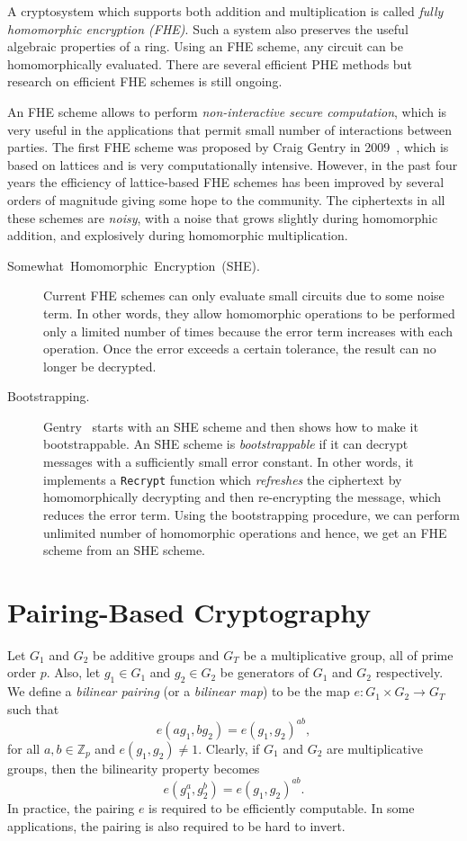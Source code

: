 \documentclass[10pt]{article}
\theoremstyle{plain}
\begin{document}
A cryptosystem which supports both addition and multiplication is
called \textit{fully homomorphic encryption (FHE)}. Such a system
also preserves the useful algebraic properties of a ring. Using an
FHE scheme, any circuit can be homomorphically evaluated. There are
several efficient PHE methods but research on efficient FHE schemes
is still ongoing.

An FHE scheme allows to perform \emph{non-interactive secure computation},
which is very useful in the applications that permit small number
of interactions between parties. The first FHE scheme was proposed
by Craig Gentry in 2009~\cite{Gentry:2009:FHE:1536414.1536440},
which is based on lattices and is very computationally intensive.
However, in the past four years the efficiency of lattice-based FHE
schemes has been improved by several orders of magnitude giving some
hope to the community. The ciphertexts in all these schemes are \emph{noisy},
with a noise that grows slightly during homomorphic addition, and
explosively during homomorphic multiplication.
\begin{description}
	\item [{Somewhat~Homomorphic~Encryption~(SHE).}] Current FHE schemes
	can only evaluate small circuits due to some noise term. In other
	words, they allow homomorphic operations to be performed only a limited
	number of times because the error term increases with each operation.
	Once the error exceeds a certain tolerance, the result can no longer
	be decrypted.
	\item [{Bootstrapping.}] Gentry~\cite{Gentry:2009:FHE:1536414.1536440}
	starts with an SHE scheme and then shows how to make it bootstrappable.
	An SHE scheme is \emph{bootstrappable} if it can decrypt messages
	with a sufficiently small error constant. In other words, it implements
	a \texttt{Recrypt} function which \emph{refreshes} the ciphertext
	by homomorphically decrypting and then re-encrypting the message,
	which reduces the error term. Using the bootstrapping procedure, we
	can perform unlimited number of homomorphic operations and hence,
	we get an FHE scheme from an SHE scheme.
\end{description}

\section{Pairing-Based Cryptography}

Let $G_{1}$ and $G_{2}$ be additive groups and $G_{T}$ be a multiplicative
group, all of prime order $p$. Also, let $g_{1}\in G_{1}$ and $g_{2}\in G_{2}$
be generators of $G_{1}$ and $G_{2}$ respectively. We define a \emph{bilinear
	pairing} (or a \emph{bilinear map}) to be the map $e:G_{1}\times G_{2}\to G_{T}$
such that 
\[
e(ag_{1},bg_{2})=e(g_{1},g_{2})^{ab},
\]
for all $a,b\in\mathbb{Z}_{p}$ and $e(g_{1},g_{2})\neq1$. Clearly,
if $G_{1}$ and $G_{2}$ are multiplicative groups, then the bilinearity
property becomes 
\[
e(g_{1}^{a},g_{2}^{b})=e(g_{1},g_{2})^{ab}.
\]
In practice, the pairing $e$ is required to be efficiently computable.
In some applications, the pairing is also required to be hard to invert.
\end{document}
